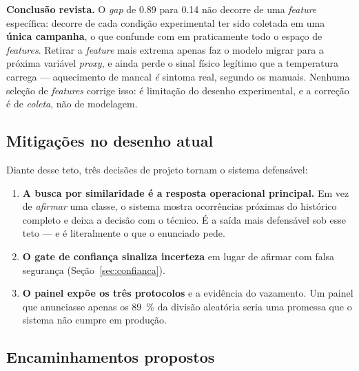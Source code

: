 \begin{limitacao}
\textbf{Conclusão revista.} O \textit{gap} de \num{0,89} para \num{0,14} não
decorre de uma \textit{feature} específica: decorre de cada condição
experimental ter sido coletada em uma \textbf{única campanha}, o que confunde
 com  em praticamente todo o espaço de \textit{features}.
Retirar a \textit{feature} mais extrema apenas faz o modelo migrar para a
próxima variável \textit{proxy}, e ainda perde o sinal físico legítimo que a
temperatura carrega --- aquecimento de mancal \emph{é} sintoma real, segundo os
manuais. Nenhuma seleção de \textit{features} corrige isso: é limitação do
desenho experimental, e a correção é de \emph{coleta}, não de modelagem.
\end{limitacao}

\subsection{Mitigações no desenho atual}

Diante desse teto, três decisões de projeto tornam o sistema defensável:

\begin{enumerate}
  \item \textbf{A busca por similaridade é a resposta operacional principal.}
    Em vez de \emph{afirmar} uma classe, o sistema mostra ocorrências próximas
    do histórico completo e deixa a decisão com o técnico. É a saída mais
    defensável sob esse teto --- e é literalmente o que o enunciado pede.
  \item \textbf{O gate de confiança sinaliza incerteza} em lugar de afirmar com
    falsa segurança (Seção~\ref{sec:confianca}).
  \item \textbf{O painel expõe os três protocolos} e a evidência do vazamento.
    Um painel que anunciasse apenas os \SI{89}{\percent} da divisão aleatória
    seria uma promessa que o sistema não cumpre em produção.
\end{enumerate}

\subsection{Encaminhamentos propostos}

